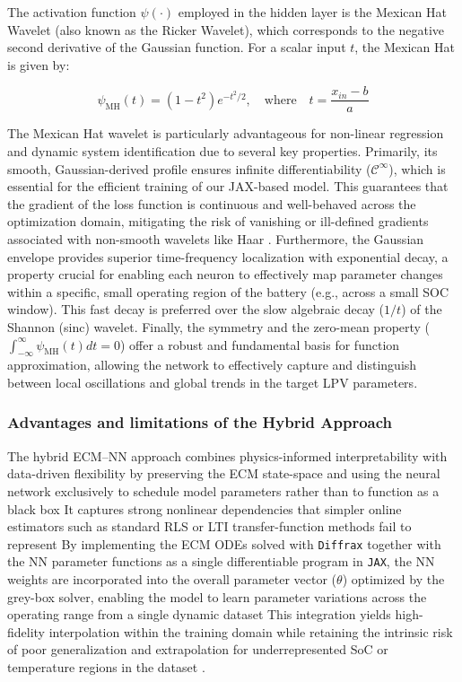 \documentclass[lettersize,journal]{IEEEtran}
\begin{document}
The activation function $\psi(\cdot)$ employed in the hidden layer is the Mexican Hat Wavelet (also known as the Ricker Wavelet), which corresponds to the negative second derivative of the Gaussian function. For a scalar input $t$, the Mexican Hat is given by:

\begin{equation}
	\psi_{\text{MH}}(t) = (1 - t^2) e^{-t^2/2}, \quad \text{where} \quad t = \frac{x_{in} - b}{a}
	\label{eq:mexican_hat}
\end{equation}

The Mexican Hat wavelet is particularly advantageous for non-linear regression and dynamic system identification due to several key properties. Primarily, its smooth, Gaussian-derived profile ensures infinite differentiability ($\mathcal{C}^\infty$), which is essential for the efficient training of our JAX-based model. This guarantees that the gradient of the loss function is continuous and well-behaved across the optimization domain, mitigating the risk of vanishing or ill-defined gradients associated with non-smooth wavelets like Haar \cite{Kumar2024Corneal,Sahoo2023LBFGS}. Furthermore, the Gaussian envelope provides superior time-frequency localization with exponential decay, a property crucial for enabling each neuron to effectively map parameter changes within a specific, small operating region of the battery (e.g., across a small SOC window). This fast decay is preferred over the slow algebraic decay ($1/t$) of the Shannon (sinc) wavelet. Finally, the symmetry and the zero-mean property ($\int_{-\infty}^{\infty} \psi_{\text{MH}}(t) dt = 0$) offer a robust and fundamental basis for function approximation, allowing the network to effectively capture and distinguish between local oscillations and global trends in the target LPV parameters\cite{Kumar2024Corneal}.

\subsubsection{Advantages and limitations of the Hybrid Approach}

The hybrid ECM–NN approach combines physics-informed interpretability with data-driven flexibility by preserving the ECM state-space and using the neural network exclusively to schedule model parameters rather than to function as a black box \cite{takyi2023narx, xia2024hybrid} It captures strong nonlinear dependencies that simpler online estimators such as standard RLS or LTI transfer-function methods fail to represent \cite{tran2021comprehensive, pai2023online} By implementing the ECM ODEs solved with \texttt{Diffrax} together with the NN parameter functions as a single differentiable program in \texttt{JAX}, the NN weights are incorporated into the overall parameter vector ($\theta$) optimized by the grey-box solver, enabling the model to learn parameter variations across the operating range from a single dynamic dataset This integration yields high-fidelity interpolation within the training domain while retaining the intrinsic risk of poor generalization and extrapolation for underrepresented SoC or temperature regions in the dataset \cite{valizadeh2024machine, kawahara2023battery}.
\end{document}
